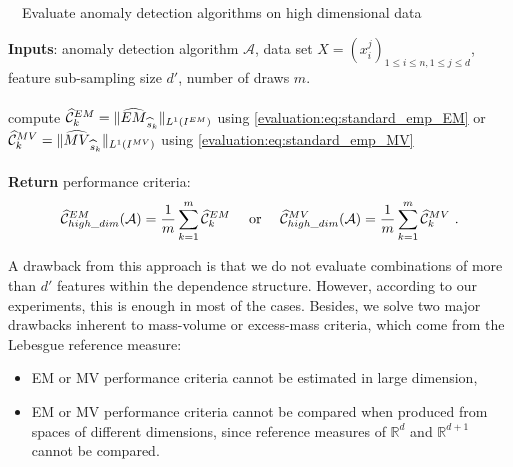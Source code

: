 \begin{algorithm}[!tbh]
\caption{~~Evaluate anomaly detection algorithms on high dimensional data}
\label{evaluation:algo:EMMV}
\begin{algorithmic}
  \STATE \textbf{Inputs}: anomaly detection algorithm $\mathcal{A}$, data set $X = (x^j_i)_{1 \le i \le n, 1 \le j \le d }$, feature sub-sampling size $d'$, number of draws $m$.\\~\\

    \STATE compute $\widehat{\mathcal{C}}_k^{EM} = \| \widehat{EM}_{\widehat s_k} \|_{L^1(I^{EM})}$ using \eqref{evaluation:eq:standard_emp_EM} or $\widehat{\mathcal{C}}_k^{MV} = \| \widehat{MV}_{\widehat s_k} \|_{L^1(I^{MV})}$ using \eqref{evaluation:eq:standard_emp_MV}
  \ENDFOR \\~\\

  \STATE \textbf{Return} performance criteria: $$\widehat{\mathcal{C}}^{EM}_{high\_dim} (\mathcal{A})= \frac{1}{m} \sum_{k=1}^m\widehat {\mathcal{C}}_k^{EM} \text{~~~~or~~~~} \widehat{\mathcal{C}}^{MV}_{high\_dim}(\mathcal{A}) = \frac{1}{m} \sum_{k=1}^m\widehat {\mathcal{C}}_k^{MV}~.$$
\end{algorithmic}
\end{algorithm}
%

A drawback from this approach is that we do not evaluate combinations of more than $d'$ features within the dependence structure. However, according to our experiments, this is enough in most of the cases. Besides, we solve two major drawbacks inherent to mass-volume or excess-mass criteria, %
which come from the Lebesgue reference measure:
\begin{itemize}
\item  EM or MV performance criteria cannot be estimated in large dimension,
\item  EM or MV performance criteria cannot be compared when produced from spaces of different dimensions, since reference measures of $\mathbb{R}^d$ and $\mathbb{R}^{d+1}$ cannot be compared.
\end{itemize}

